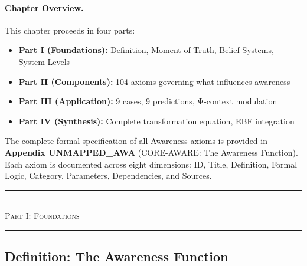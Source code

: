 \paragraph{Chapter Overview.}
This chapter proceeds in four parts:
\begin{itemize}
    \item \textbf{Part I (Foundations):} Definition, Moment of Truth, Belief Systems, System Levels
    \item \textbf{Part II (Components):} 104 axioms governing what influences awareness
    \item \textbf{Part III (Application):} 9 cases, 9 predictions, Ψ-context modulation
    \item \textbf{Part IV (Synthesis):} Complete transformation equation, EBF integration
\end{itemize}

\begin{note}
The complete formal specification of all Awareness axioms is provided in
\textbf{Appendix UNMAPPED_AWA} (CORE-AWARE: The Awareness Function).
Each axiom is documented across eight dimensions: ID, Title, Definition,
Formal Logic, Category, Parameters, Dependencies, and Sources.
\end{note}



\begin{center}
\rule{0.8\textwidth}{0.4pt}\\[0.5em]
{\large\textsc{Part I: Foundations}}\\[0.3em]
\rule{0.8\textwidth}{0.4pt}
\end{center}

\subsection{Definition: The Awareness Function}
\label{subsec:11-1-definition}



